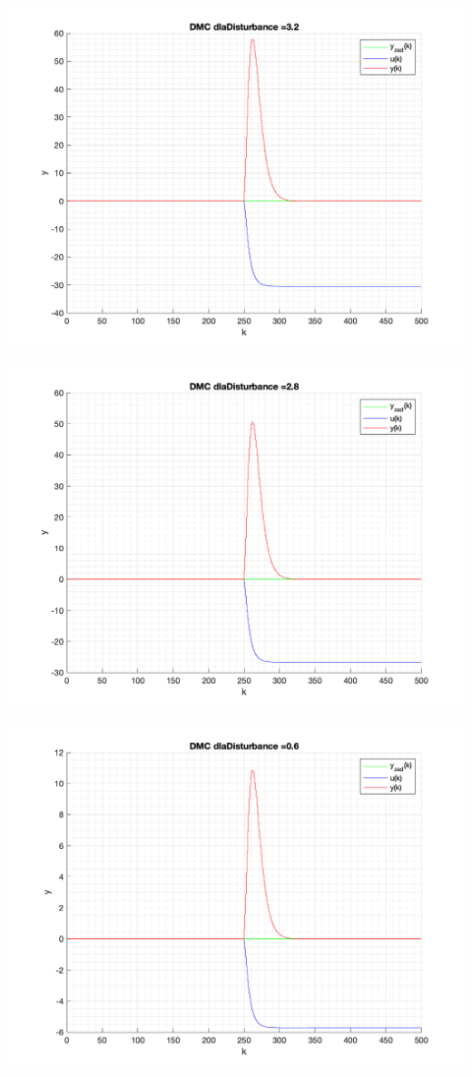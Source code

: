 \documentclass[a4paper, 11pt]{article}
\begin{document}
\begin{enumerate}
 \includegraphics[width=\linewidth]{./ModelsP4_Disturbance/P4_DMC_Disturbance_3_2_png.png} 
 
 \includegraphics[width=\linewidth]{./ModelsP4_Disturbance/P4_DMC_Disturbance_2_8_png.png} 
 
 \includegraphics[width=\linewidth]{./ModelsP4_Disturbance/P4_DMC_Disturbance_0_6_png.png} 
 

\end{enumerate}
\end{document}
